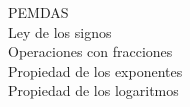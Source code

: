 \documentclass[preview]{standalone}
\begin{document}
PEMDAS\\Ley de los signos\\Operaciones con fracciones\\Propiedad de los exponentes\\Propiedad de los logaritmos\\
\end{document}

